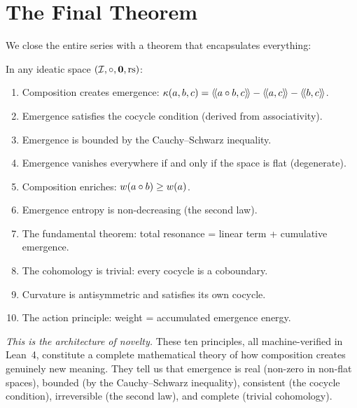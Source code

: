\section{The Final Theorem}

We close the entire series with a theorem that encapsulates everything:

\begin{theorem}
\label{thm:architecture}
In any ideatic space $(\mathcal{I}, \circ, \mathbf{0}, \mathrm{rs})$:
\begin{enumerate}
  \item Composition creates emergence: $\kappa(a,b,c) = \langle\!\langle a \circ b, c \rangle\!\rangle
    - \langle\!\langle a, c \rangle\!\rangle - \langle\!\langle b, c \rangle\!\rangle$.
  \item Emergence satisfies the cocycle condition (derived from associativity).
  \item Emergence is bounded by the Cauchy--Schwarz inequality.
  \item Emergence vanishes everywhere if and only if the space is flat
    (degenerate).
  \item Composition enriches: $w(a \circ b) \geq w(a)$.
  \item Emergence entropy is non-decreasing (the second law).
  \item The fundamental theorem: total resonance = linear term + cumulative emergence.
  \item The cohomology is trivial: every cocycle is a coboundary.
  \item Curvature is antisymmetric and satisfies its own cocycle.
  \item The action principle: weight = accumulated emergence energy.
\end{enumerate}

\emph{This is the architecture of novelty.} These ten principles, all
machine-verified in Lean~4, constitute a complete mathematical theory of how
composition creates genuinely new meaning. They tell us that emergence is
real (non-zero in non-flat spaces), bounded (by the Cauchy--Schwarz inequality),
consistent (the cocycle condition), irreversible (the second law), and complete
(trivial cohomology).
\end{theorem}

